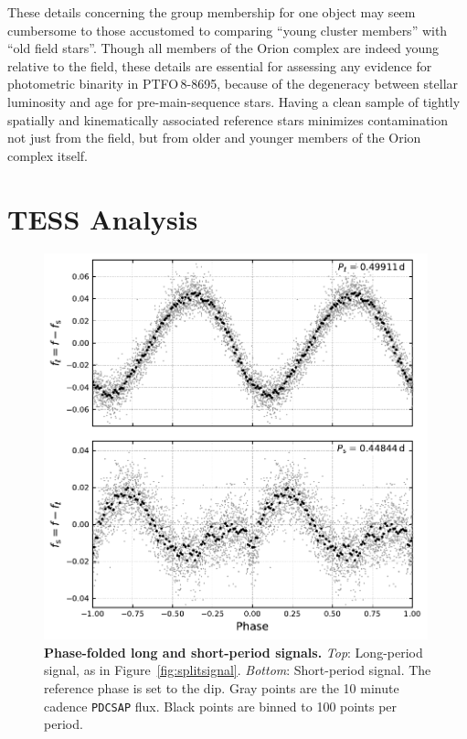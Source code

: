 \documentclass[12pt,twocolumn,tighten]{aastex62}
\newcommand{\ptfo}{PTFO$\,$8-8695}
\begin{document}
These details concerning the group membership for one object may seem
cumbersome to those accustomed to comparing ``young cluster members''
with ``old field stars''.  Though all members of the Orion complex are
indeed young relative to the field, these details are essential for
assessing any evidence for photometric binarity in \ptfo, because of
the degeneracy between stellar luminosity and age for
pre-main-sequence stars.  Having a clean sample of tightly spatially
and kinematically associated reference stars minimizes contamination
not just from the field, but from older and younger members of the
Orion complex itself.


\section{TESS Analysis}
\label{sec:tess}

\begin{figure}[t]
	\begin{center}
		\leavevmode
		\includegraphics[width=0.99\textwidth]{f3.pdf}
	\end{center}
	\vspace{-0.7cm}
	\caption{ {\bf Phase-folded long and short-period signals.}
    {\it Top}: Long-period signal, as in Figure~\ref{fig:splitsignal}.
    {\it Bottom}: Short-period signal. The reference phase is set to
    the dip.  Gray points are the 10 minute cadence
    \texttt{PDCSAP} flux.  Black points are binned to 100 points per
    period.
		\label{fig:phasefold}
	}
\end{figure}
\end{document}
